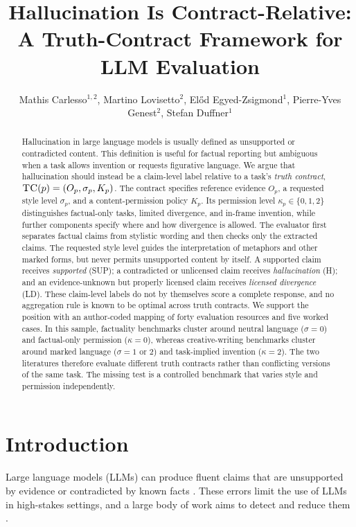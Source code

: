 \documentclass{clv2025}
\title{Hallucination Is Contract-Relative: A Truth-Contract Framework for LLM Evaluation}
\author{Mathis Carlesso$^{1,2}$, Martino Lovisetto$^{2}$, El\H{o}d Egyed-Zsigmond$^{1}$, Pierre-Yves Genest$^{2}$, Stefan Duffner$^{1}$}
\affil{INSA Lyon, CNRS, LIRIS, UMR5205, Universit\'e Claude Bernard Lyon 1, 69621 Villeurbanne, France\\
  \quad \email{mathis.carlesso@insa-lyon.fr}}
\affil{Alteca, 69100 Villeurbanne, France}
\newcommand{\TC}{\textsc{TC}}
\newcommand{\LD}{\textsc{LD}}
\newcommand{\Hall}{\textsc{H}}
\newcommand{\SUP}{\textsc{SUP}}
\begin{document}
\maketitle

\begin{abstract}
Hallucination in large language models is usually defined as unsupported or contradicted content.
This definition is useful for factual reporting but ambiguous when a task allows invention or requests figurative language.
We argue that hallucination should instead be a claim-level label relative to a task's \emph{truth contract}, $\TC(p)=(O_p,\sigma_p,K_p)$.
The contract specifies reference evidence $O_p$, a requested style level $\sigma_p$, and a content-permission policy $K_p$.
Its permission level $\kappa_p\in\{0,1,2\}$ distinguishes factual-only tasks, limited divergence, and in-frame invention, while further components specify where and how divergence is allowed.
The evaluator first separates factual claims from stylistic wording and then checks only the extracted claims.
The requested style level guides the interpretation of metaphors and other marked forms, but never permits unsupported content by itself.
A supported claim receives \emph{supported} (\SUP); a contradicted or unlicensed claim receives \emph{hallucination} (\Hall); and an evidence-unknown but properly licensed claim receives \emph{licensed divergence} (\LD).
These claim-level labels do not by themselves score a complete response, and no aggregation rule is known to be optimal across truth contracts.
We support the position with an author-coded mapping of forty evaluation resources and five worked cases.
In this sample, factuality benchmarks cluster around neutral language ($\sigma=0$) and factual-only permission ($\kappa=0$), whereas creative-writing benchmarks cluster around marked language ($\sigma=1$ or $2$) and task-implied invention ($\kappa=2$).
The two literatures therefore evaluate different truth contracts rather than conflicting versions of the same task.
The missing test is a controlled benchmark that varies style and permission independently.
\end{abstract}

\section{Introduction}\label{sec:intro}

Large language models (LLMs) can produce fluent claims that are unsupported by evidence or contradicted by known facts \citep{ji_survey_2023,huang_survey_2025}.
These errors limit the use of LLMs in high-stakes settings, and a large body of work aims to detect and reduce them \citep{lin_truthfulqa_2022,li_halueval_2023,wei_measuring_2024}.
\end{document}
